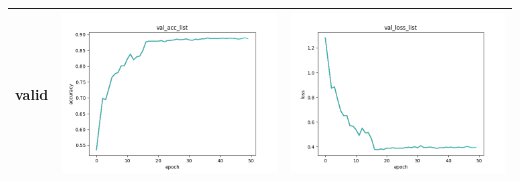 \documentclass[a4paper, 12pt]{article}
\begin{document}
\begin{table}[!htb]
\begin{tabular}{|c|c|c|}
    \hline
    valid & \includegraphics[scale=0.5]{p2/experiment/mynet_2024_04_14_21_58_22_sgd_pre_da/log/val_acc_list.png}   & \includegraphics[scale=0.5]{p2/experiment/mynet_2024_04_14_21_58_22_sgd_pre_da/log/val_loss_list.png}   \\
    \hline
  \end{tabular}
\end{table}
\end{document}
